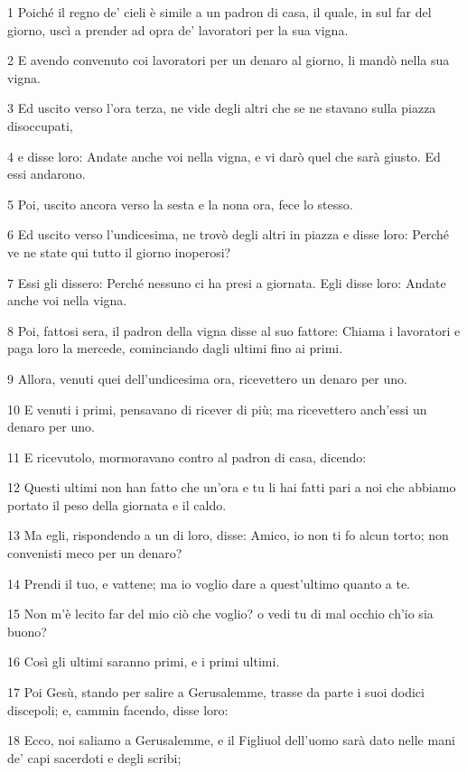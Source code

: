 \par 1 Poiché il regno de' cieli è simile a un padron di casa, il quale, in sul far del giorno, uscì a prender ad opra de' lavoratori per la sua vigna.
\par 2 E avendo convenuto coi lavoratori per un denaro al giorno, li mandò nella sua vigna.
\par 3 Ed uscito verso l'ora terza, ne vide degli altri che se ne stavano sulla piazza disoccupati,
\par 4 e disse loro: Andate anche voi nella vigna, e vi darò quel che sarà giusto. Ed essi andarono.
\par 5 Poi, uscito ancora verso la sesta e la nona ora, fece lo stesso.
\par 6 Ed uscito verso l'undicesima, ne trovò degli altri in piazza e disse loro: Perché ve ne state qui tutto il giorno inoperosi?
\par 7 Essi gli dissero: Perché nessuno ci ha presi a giornata. Egli disse loro: Andate anche voi nella vigna.
\par 8 Poi, fattosi sera, il padron della vigna disse al suo fattore: Chiama i lavoratori e paga loro la mercede, cominciando dagli ultimi fino ai primi.
\par 9 Allora, venuti quei dell'undicesima ora, ricevettero un denaro per uno.
\par 10 E venuti i primi, pensavano di ricever di più; ma ricevettero anch'essi un denaro per uno.
\par 11 E ricevutolo, mormoravano contro al padron di casa, dicendo:
\par 12 Questi ultimi non han fatto che un'ora e tu li hai fatti pari a noi che abbiamo portato il peso della giornata e il caldo.
\par 13 Ma egli, rispondendo a un di loro, disse: Amico, io non ti fo alcun torto; non convenisti meco per un denaro?
\par 14 Prendi il tuo, e vattene; ma io voglio dare a quest'ultimo quanto a te.
\par 15 Non m'è lecito far del mio ciò che voglio? o vedi tu di mal occhio ch'io sia buono?
\par 16 Così gli ultimi saranno primi, e i primi ultimi.
\par 17 Poi Gesù, stando per salire a Gerusalemme, trasse da parte i suoi dodici discepoli; e, cammin facendo, disse loro:
\par 18 Ecco, noi saliamo a Gerusalemme, e il Figliuol dell'uomo sarà dato nelle mani de' capi sacerdoti e degli scribi;
